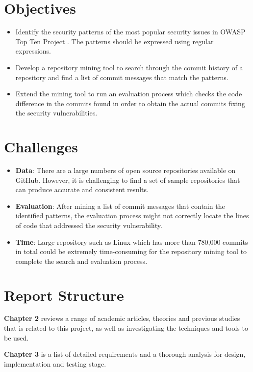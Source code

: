 \documentclass[12pt, a4paper]{report}
\begin{document}
\section{Objectives}
\label{sec:objectives}
\begin{itemize}
	\item Identify the security patterns of the most popular security issues in OWASP Top Ten Project
	\cite{owasp_2017}. The patterns should be expressed using regular expressions.
	\item Develop a repository mining tool to search through the commit history of a repository and
	find a list of commit messages that match the patterns.
	\item Extend the mining tool to run an evaluation process which checks the code difference in the
	commits found in order to obtain the actual commits fixing the security vulnerabilities.
\end{itemize}

\section{Challenges}
\begin{itemize}
	\item \textbf{Data}: There are a large numbers of open source repositories available on GitHub.
	However, it is challenging to find a set of sample repositories that can produce accurate and
	consistent results.
	\item \textbf{Evaluation}: After mining a list of commit messages that contain the identified
	patterns, the evaluation process might not correctly locate the lines of code that addressed the
	security vulnerability.
	\item \textbf{Time}: Large repository such as Linux which has more than 780,000 commits in total
	\cite{linux_repo} could be extremely time-consuming for the repository mining tool to complete the
	search and evaluation process.
\end{itemize}

\section{Report Structure}
\textbf{Chapter 2} reviews a range of academic articles, theories and previous studies that
is related to this project, as well as investigating the techniques and tools to be used.

\noindent\textbf{Chapter 3} is a list of detailed requirements and a thorough analysis for design,
implementation and testing stage.
\end{document}
